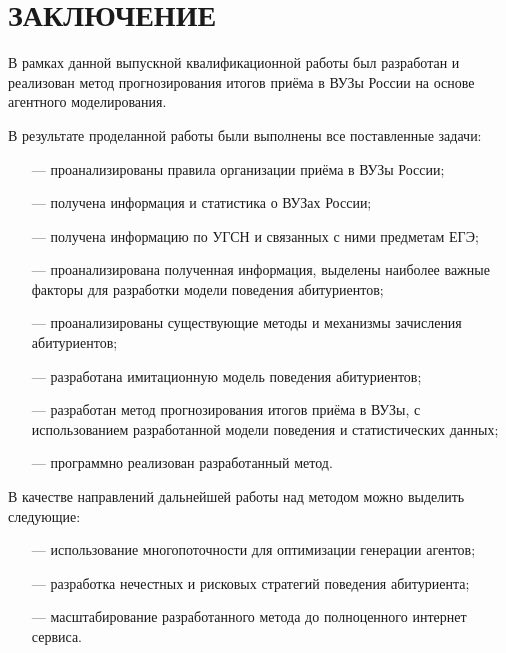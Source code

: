 \section*{ЗАКЛЮЧЕНИЕ}

В рамках данной выпускной квалификационной работы был разработан и
реализован  метод прогнозирования итогов приёма в ВУЗы России на основе агентного моделирования.

В результате проделанной работы были выполнены все поставленные задачи:

\begin{itemize}[leftmargin=1.6\parindent]
	\item[---] проанализированы правила организации приёма в ВУЗы России;
	\item[---] получена информация и статистика о ВУЗах России;
	\item[---] получена информацию по УГСН и связанных с ними предметам ЕГЭ;
	\item[---] проанализирована полученная информация, выделены наиболее важные факторы для разработки модели поведения абитуриентов;
	\item[---] проанализированы существующие методы и механизмы зачисления абитуриентов;
	\item[---] разработана имитационную модель поведения абитуриентов;
	\item[---] разработан метод прогнозирования итогов приёма в ВУЗы, с использованием разработанной модели поведения и статистических данных;
	\item[---] программно реализован разработанный метод.
\end{itemize}

В качестве направлений дальнейшей работы над методом можно выделить следующие:

\begin{itemize}[leftmargin=1.6\parindent]
	\item[---] использование многопоточности для оптимизации генерации агентов;
	\item[---] разработка нечестных и рисковых стратегий поведения абитуриента;
	\item[---] масштабирование разработанного метода до полноценного интернет сервиса.
\end{itemize}

\pagebreak